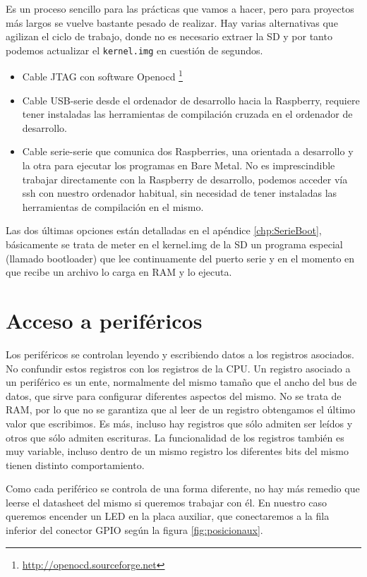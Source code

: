 Es un proceso sencillo para las prácticas que vamos a hacer, pero para proyectos más largos
se vuelve bastante pesado de realizar. Hay varias alternativas que agilizan el ciclo de
trabajo, donde no es necesario extraer la SD y por tanto podemos actualizar el {\tt kernel.img}
en cuestión de segundos.

\begin{itemize}
  \item Cable JTAG con software Openocd \footnote{\url{http://openocd.sourceforge.net}}
  \item Cable USB-serie desde el ordenador de desarrollo hacia la Raspberry, requiere
        tener instaladas las herramientas de compilación cruzada en el ordenador de desarrollo.
  \item Cable serie-serie que comunica dos Raspberries, una orientada a desarrollo y la otra
        para ejecutar los programas en Bare Metal. No es imprescindible trabajar directamente
        con la Raspberry de desarrollo, podemos acceder vía ssh con nuestro ordenador habitual,
        sin necesidad de tener instaladas las herramientas de compilación en el mismo.
\end{itemize}

Las dos últimas opciones están detalladas en el apéndice \ref{chp:SerieBoot},
básicamente se trata de meter en el kernel.img de la SD un programa especial (llamado
bootloader) que lee continuamente del puerto serie y en el momento en que recibe
un archivo lo carga en RAM y lo ejecuta.

\section{Acceso a periféricos}

Los periféricos se controlan leyendo y escribiendo datos a los registros asociados. No
confundir estos registros con los registros de la CPU. Un registro asociado a un periférico
es un ente, normalmente del mismo tamaño que el ancho del bus de datos, que sirve para
configurar diferentes aspectos del mismo. No se trata de RAM, por lo que no se garantiza que
al leer de un registro obtengamos el último valor que escribimos. Es más, incluso hay
registros que sólo admiten ser leídos y otros que sólo admiten escrituras. La funcionalidad
de los registros también es muy variable, incluso dentro de un mismo registro los diferentes
bits del mismo tienen distinto comportamiento.

Como cada periférico se controla de una forma diferente, no hay más remedio que leerse
el datasheet del mismo si queremos trabajar con él. En nuestro caso queremos encender un LED
en la placa auxiliar, que conectaremos a la fila inferior del conector GPIO según la
figura \ref{fig:posicionaux}.

